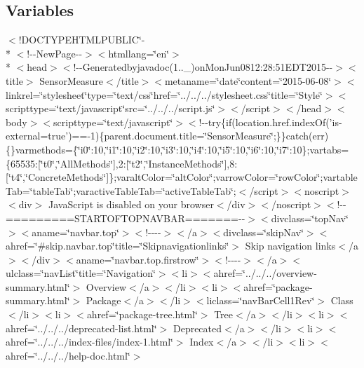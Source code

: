 \subsection*{Variables}
\begin{DoxyCompactItemize}
\item 
$<$!D\-O\-C\-T\-Y\-P\-E\-H\-T\-M\-L\-P\-U\-B\-L\-I\-C\char`\"{}-\/\\*
$<$!-\/-\/New\-Page-\/-\/$>$$<$htmllang=\char`\"{}en\char`\"{}$>$\\*
$<$head$>$$<$!-\/-\/Generatedbyjavadoc(1..\-\_)on\-Mon\-Jun0812\-:28\-:51\-E\-D\-T2015-\/-\/$>$$<$title$>$ Sensor\-Measure$<$/title$>$$<$metaname=\char`\"{}date\char`\"{}content=\char`\"{}2015-\/06-\/08\char`\"{}$>$$<$linkrel=\char`\"{}stylesheet\char`\"{}type=\char`\"{}text/css\char`\"{}href=\char`\"{}../../../stylesheet.\-css\char`\"{}title=\char`\"{}\-Style\char`\"{}$>$$<$scripttype=\char`\"{}text/javascript\char`\"{}src=\char`\"{}../../../script.\-js\char`\"{}$>$$<$/script$>$$<$/head$>$$<$body$>$$<$scripttype=\char`\"{}text/javascript\char`\"{}$>$$<$!-\/-\/try\{if(location.\-href.\-index\-Of('is-\/external=true')==-\/1)\{parent.\-document.\-title=\char`\"{}\-Sensor\-Measure\char`\"{};\}\}catch(err)\{\}varmethods=\{\char`\"{}i0\char`\"{}\-:10,\char`\"{}i1\char`\"{}\-:10,\char`\"{}i2\char`\"{}\-:10,\char`\"{}i3\char`\"{}\-:10,\char`\"{}i4\char`\"{}\-:10,\char`\"{}i5\char`\"{}\-:10,\char`\"{}i6\char`\"{}\-:10,\char`\"{}i7\char`\"{}\-:10\};vartabs=\{65535\-:\mbox{[}\char`\"{}t0\char`\"{},\char`\"{}\-All\-Methods\char`\"{}\mbox{]},2\-:\mbox{[}\char`\"{}t2\char`\"{},\char`\"{}\-Instance\-Methods\char`\"{}\mbox{]},8\-:\mbox{[}\char`\"{}t4\char`\"{},\char`\"{}\-Concrete\-Methods\char`\"{}\mbox{]}\};varalt\-Color=\char`\"{}alt\-Color\char`\"{};varrow\-Color=\char`\"{}row\-Color\char`\"{};vartable\-Tab=\char`\"{}table\-Tab\char`\"{};varactive\-Table\-Tab=\char`\"{}active\-Table\-Tab\char`\"{};$<$/script$>$$<$noscript$>$$<$div$>$ Java\-Script is disabled on your browser$<$/div$>$$<$/noscript$>$$<$!-\/-\/=========\-S\-T\-A\-R\-T\-O\-F\-T\-O\-P\-N\-A\-V\-B\-A\-R=======-\/-\/$>$$<$divclass=\char`\"{}top\-Nav\char`\"{}$>$$<$aname=\char`\"{}navbar.\-top\char`\"{}$>$$<$!-\/-\/-\/-\/$>$$<$/a$>$$<$divclass=\char`\"{}skip\-Nav\char`\"{}$>$$<$ahref=\char`\"{}\#skip.\-navbar.\-top\char`\"{}title=\char`\"{}\-Skipnavigationlinks\char`\"{}$>$ Skip navigation links$<$/a$>$$<$/div$>$$<$aname=\char`\"{}navbar.\-top.\-firstrow\char`\"{}$>$$<$!-\/-\/-\/-\/$>$$<$/a$>$$<$ulclass=\char`\"{}nav\-List\char`\"{}title=\char`\"{}\-Navigation\char`\"{}$>$$<$li$>$$<$ahref=\char`\"{}../../../overview-\/summary.\-html\char`\"{}$>$ Overview$<$/a$>$$<$/li$>$$<$li$>$$<$ahref=\char`\"{}package-\/summary.\-html\char`\"{}$>$ Package$<$/a$>$$<$/li$>$$<$liclass=\char`\"{}nav\-Bar\-Cell1\-Rev\char`\"{}$>$ Class$<$/li$>$$<$li$>$$<$ahref=\char`\"{}package-\/tree.\-html\char`\"{}$>$ Tree$<$/a$>$$<$/li$>$$<$li$>$$<$ahref=\char`\"{}../../../deprecated-\/list.\-html\char`\"{}$>$ Deprecated$<$/a$>$$<$/li$>$$<$li$>$$<$ahref=\char`\"{}../../../index-\/files/index-\/1.\-html\char`\"{}$>$ Index$<$/a$>$$<$/li$>$$<$li$>$$<$ahref=\char`\"{}../../../help-\/doc.\-html\char`\"{}$>$ $$
\end{DoxyCompactItemize}
